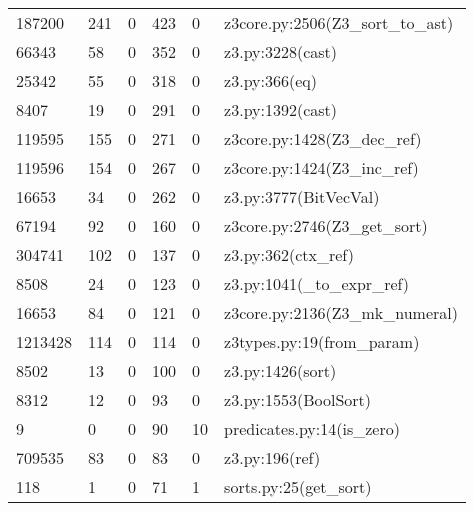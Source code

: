 \documentclass[a4paper,UKenglish,cleveref, autoref, thm-restate]{lipics-v2019}
\begin{document}
\begin{table}[]
\begin{tabular}{lllll|l}
		187200  & 241     & 0       & 423     & 0       & z3core.py:2506(Z3\_sort\_to\_ast)                              \\
		66343   & 58      & 0       & 352     & 0       & z3.py:3228(cast)                                               \\
		25342   & 55      & 0       & 318     & 0       & z3.py:366(eq)                                                  \\
		8407    & 19      & 0       & 291     & 0       & z3.py:1392(cast)                                               \\
		119595  & 155     & 0       & 271     & 0       & z3core.py:1428(Z3\_dec\_ref)                                   \\
		119596  & 154     & 0       & 267     & 0       & z3core.py:1424(Z3\_inc\_ref)                                   \\
		16653   & 34      & 0       & 262     & 0       & z3.py:3777(BitVecVal)                                          \\
		67194   & 92      & 0       & 160     & 0       & z3core.py:2746(Z3\_get\_sort)                                  \\
		304741  & 102     & 0       & 137     & 0       & z3.py:362(ctx\_ref)                                            \\
		8508    & 24      & 0       & 123     & 0       & z3.py:1041(\_to\_expr\_ref)                                    \\
		16653   & 84      & 0       & 121     & 0       & z3core.py:2136(Z3\_mk\_numeral)                                \\
		1213428 & 114     & 0       & 114     & 0       & z3types.py:19(from\_param)                                     \\
		8502    & 13      & 0       & 100     & 0       & z3.py:1426(sort)                                               \\
		8312    & 12      & 0       & 93      & 0       & z3.py:1553(BoolSort)                                           \\
		9       & 0       & 0       & 90      & 10      & predicates.py:14(is\_zero)                                     \\
		709535  & 83      & 0       & 83      & 0       & z3.py:196(ref)                                                 \\
		118     & 1       & 0       & 71      & 1       & sorts.py:25(get\_sort)                                         \\

\end{tabular}
\end{table}
\end{document}
